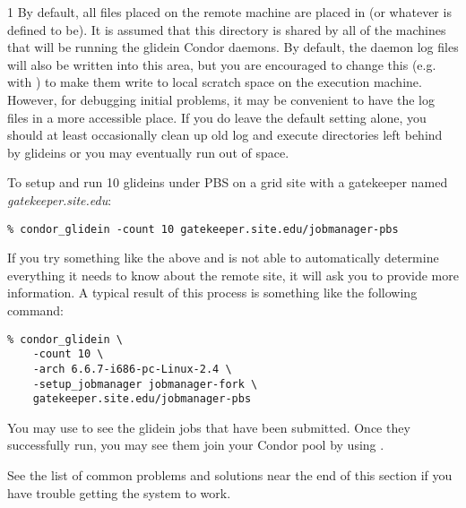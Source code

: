 \begin{ManPage}{\label{man-condor-glidein}}{1}
By default, all files placed on the remote machine are placed in
 (or whatever  is
defined to be).  It is assumed that this directory is shared by all of
the machines that will be running the glidein Condor daemons.  By
default, the daemon log files will also be written into this area, but
you are encouraged to change this (e.g. with ) to make
them write to local scratch space on the execution machine.  However,
for debugging initial problems, it may be convenient to have the log
files in a more accessible place.  If you do leave the default
setting alone, you should at least occasionally clean up old
log and execute directories left behind by glideins or you may eventually
run out of space.

\Examples

To setup and run 10 glideins under PBS on a grid site with a
gatekeeper named \textit{gatekeeper.site.edu}:
\begin{verbatim}
% condor_glidein -count 10 gatekeeper.site.edu/jobmanager-pbs
\end{verbatim}

If you try something like the above and  is not able to
automatically determine everything it needs to know about the remote site,
it will ask you to provide more information.  A typical result of this
process is something like the following command:
\begin{verbatim}
% condor_glidein \
    -count 10 \
    -arch 6.6.7-i686-pc-Linux-2.4 \
    -setup_jobmanager jobmanager-fork \
    gatekeeper.site.edu/jobmanager-pbs
\end{verbatim}

You may use  to see the glidein jobs that have been
submitted.  Once they successfully run, you may see them join your
Condor pool by using .

See the list of common problems and solutions near the end of this section
if you have trouble getting the system to work.


\end{ManPage}
